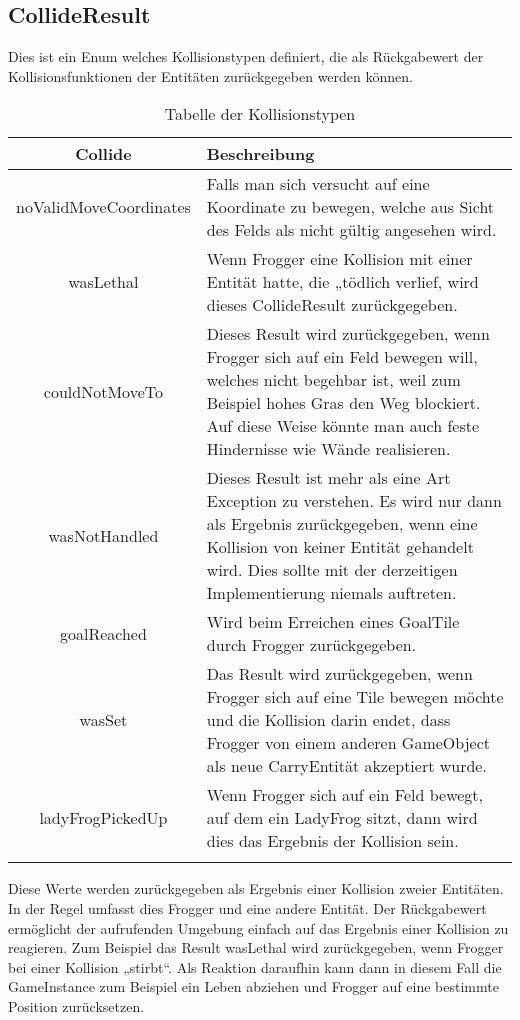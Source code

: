\documentclass[a4paper,10pt]{report}
\begin{document}
{{		}
		\newpage 
		\subsection{CollideResult}			
		{
			\label{ssec:collideresult}
			Dies ist ein Enum welches Kollisionstypen definiert, die als Rückgabewert der Kollisionsfunktionen der Entitäten zurückgegeben werden können.
					
			\begin{longtable}{|c|p{}|}
				\hline
				\textbf{Collide} & \textbf{Beschreibung} \\
				\hline
				noValidMoveCoordinates 		& Falls man sich versucht auf eine Koordinate zu bewegen, welche aus Sicht des Felds als nicht gültig angesehen wird.  		\\
				\hline				
				wasLethal 					& Wenn Frogger eine Kollision mit einer Entität hatte, die „tödlich verlief, wird dieses CollideResult zurückgegeben.		\\
				\hline
				couldNotMoveTo 				& Dieses Result wird zurückgegeben, wenn Frogger sich auf ein Feld bewegen will, welches nicht begehbar ist, 
											  weil zum Beispiel hohes Gras den Weg blockiert. Auf diese Weise könnte man auch feste Hindernisse wie Wände realisieren.	\\
				\hline	
				wasNotHandled 				& Dieses Result ist mehr als eine Art Exception zu verstehen. Es wird nur dann als Ergebnis zurückgegeben, 
											  wenn eine Kollision von keiner Entität gehandelt wird. Dies sollte mit der derzeitigen Implementierung niemals auftreten.	\\
				\hline	
				goalReached 				& Wird beim Erreichen eines GoalTile durch Frogger zurückgegeben.	\\
				\hline	
				wasSet 						& Das Result wird zurückgegeben, wenn Frogger sich auf eine Tile bewegen möchte und die Kollision darin endet, 
											  dass Frogger von einem anderen GameObject als neue CarryEntität akzeptiert wurde. \\
				\hline	
				ladyFrogPickedUp 			& Wenn Frogger sich auf ein Feld bewegt, auf dem ein LadyFrog sitzt, dann wird dies das Ergebnis der Kollision sein. \\
				\hline	
				\caption{Tabelle der Kollisionstypen}
			\end{longtable}	
			\noindent
			Diese Werte werden zurückgegeben als Ergebnis einer Kollision zweier Entitäten. In der Regel umfasst dies Frogger und eine andere Entität. 
			Der Rückgabewert ermöglicht der aufrufenden Umgebung einfach auf das Ergebnis einer Kollision zu reagieren. 
			Zum Beispiel das Result wasLethal wird zurückgegeben, wenn Frogger bei einer Kollision „stirbt“. 
			Als Reaktion daraufhin kann dann in diesem Fall die GameInstance zum Beispiel ein Leben abziehen und Frogger auf eine bestimmte Position zurücksetzen.										 
		}							
		
}
\end{document}

